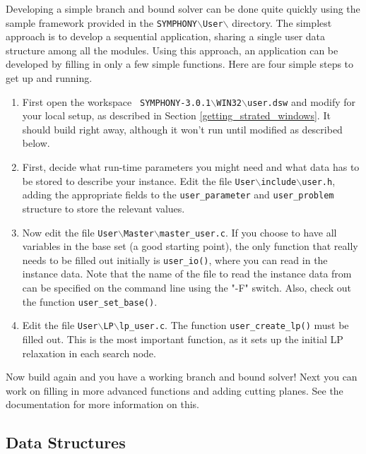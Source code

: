 Developing a simple branch and bound solver can be done quite quickly using
the sample framework provided in the 
\texttt{SYMPHONY$\backslash$User$\backslash$} directory. The
simplest approach is to develop a sequential application, sharing a single
user data structure among all the modules. Using this approach, an application
can be developed by filling in only a few simple functions. Here are four
simple steps to get up and running.
\begin{enumerate}

\item First open the workspace {\tt
SYMPHONY-3.0.1$\backslash$WIN32$\backslash$user.dsw} and modify for your local
setup, as described in Section \ref{getting_strated_windows}. It should
build right away, although it won't run until modified as described below.

\item First, decide what run-time parameters you might need and what data has 
to be stored to describe your instance. Edit the file
\texttt{User$\backslash$include$\backslash$user.h}, adding the appropriate
fields to the \texttt{user\_parameter} and \texttt{user\_problem} structure to
store the relevant values.

\item Now edit the file
\texttt{User$\backslash$Master$\backslash$master\_user.c}. If you choose to 
have all variables in the base set (a good starting point), the only function
that really needs to be filled out initially is \texttt{user\_io()}, where you
can read in the instance data. Note that the name of the file to read the
instance data from can be specified on the command line using the "-F" switch.
Also, check out the function
\texttt{user\_set\_base()}.

\item Edit the file \texttt{User$\backslash$LP$\backslash$lp\_user.c}. The
function \texttt{user\_create\_lp()} must be filled out. This is the most
important function, as it sets up the initial LP relaxation in each search
node.
\end{enumerate}

Now build again and you have a working branch and bound solver! Next you can
work on filling in more advanced functions and adding cutting planes. See the
documentation for more information on this.

\subsection{Data Structures}

